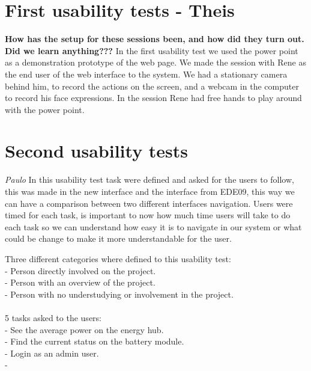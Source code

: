 \section{First usability tests - Theis}
\textbf{How has the setup for these sessions been, and how did they turn out. Did we learn anything???}
In the first usability test we used the power point as a demonstration prototype of the web page. We made the session with Rene as the end user of the web interface to the system. We had a stationary camera behind him, to record the actions on the screen, and a webcam in the computer to record his face expressions. In the session Rene had free hands to play around with the power point.


\section{Second usability tests}
\textit{Paulo}
In this usability test task were defined and asked for the users to follow, this was made in the new interface and the interface from EDE09, this way we can have a comparison between two different interfaces navigation. Users were timed for each task, is important to now how much time users will take to do each task so we can understand how easy it is to navigate in our system or what could be change to make it more understandable for the user.

Three different categories where defined to this usability test:\\
- Person directly involved on the project.\\
- Person with an overview of the project.\\
- Person with no understudying or involvement in the project.\\
\\

5 tasks asked to the users:\\
- See the average power on the energy hub.\\
- Find the current status on the battery module.\\
- Login as an admin user.\\
- 














